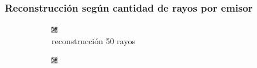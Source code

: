 \documentclass[11pt]{beamer}
\begin{document}
\begin{frame}
    \frametitle{Reconstrucción según cantidad de rayos por emisor}
    
    \begin{figure}[H]
        \centering
    
        \begin{subfigure}[h]{0.3\textwidth} 
            \includegraphics[width=\textwidth]{img/tomo_rayos_50.png}
            \caption{reconstrucción 50 rayos}
            \label{fig:reconstruccion 50 rayos}
        \end{subfigure}%
        \hfill
        \begin{subfigure}[h]{0.3\textwidth}
            \includegraphics[width=\textwidth]{img/tomo_rayos_100.png}

\end{subfigure}
\end{figure}
\end{frame}
\end{document}
